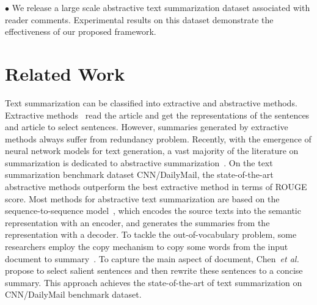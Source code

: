 \documentclass[letterpaper]{article} %
\newcommand{\etal}{\emph{et al.}\xspace}
\begin{document}
$\bullet$ We release a large scale abstractive text summarization dataset associated with reader comments.
Experimental results on this dataset demonstrate the effectiveness of our proposed framework.

\section{Related Work}
Text summarization can be classified into extractive and abstractive methods.
Extractive methods~\cite{Jadhav2018ExtractiveSW,Narayan2018RankingSF} read the article and get the representations of the sentences and article to select sentences.
However, summaries generated by extractive methods always suffer from redundancy problem.
Recently, with the emergence of neural network models for text generation, a vast majority of the literature on summarization is dedicated to abstractive summarization~\cite{Bansal2018FastAS,Ma2018AutoencoderAA,Zhou2018SequentialCN}.
On the text summarization benchmark dataset CNN/DailyMail, the state-of-the-art abstractive methods outperform the best extractive method in terms of ROUGE score.
Most methods for abstractive text summarization are based on the sequence-to-sequence model~\cite{Sutskever2014SequenceTS}, which encodes the source texts into the semantic representation with an encoder, and generates the summaries from the representation with a decoder.
To tackle the out-of-vocabulary problem, some researchers employ the copy mechanism to copy some words from the input document to summary~\cite{Gu2016IncorporatingCM,see2017get}.
To capture the main aspect of document, Chen~\etal~ propose to select salient sentences and then rewrite these sentences to a concise summary.
This approach achieves the state-of-the-art of text summarization on CNN/DailyMail benchmark dataset.
\end{document}
